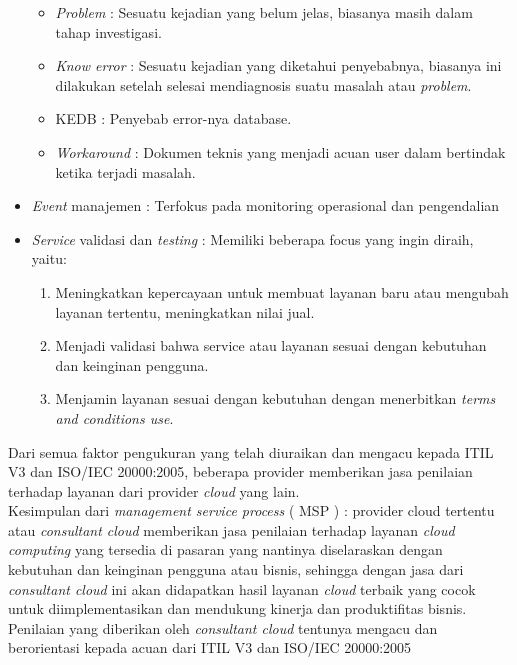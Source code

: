 \begin{itemize}
\begin{itemize}
\item \textit{Problem} : Sesuatu kejadian yang belum jelas, biasanya masih dalam tahap investigasi.
\item \textit{Know error} : Sesuatu kejadian yang diketahui penyebabnya, biasanya ini dilakukan setelah selesai mendiagnosis suatu masalah atau \textit{problem}.
\item KEDB : Penyebab error-nya database.
\item \textit{Workaround} : Dokumen teknis yang menjadi acuan user dalam bertindak ketika terjadi masalah.
\end{itemize}
\item \textit{Event} manajemen : Terfokus pada monitoring operasional dan pengendalian
\item \textit{Service} validasi dan \textit{testing} : Memiliki beberapa focus yang ingin diraih, yaitu:
\begin{enumerate}
\item Meningkatkan kepercayaan untuk membuat layanan baru atau mengubah layanan tertentu, meningkatkan nilai jual.
\item Menjadi validasi bahwa service atau layanan sesuai dengan kebutuhan dan keinginan pengguna.
\item Menjamin layanan sesuai dengan kebutuhan dengan menerbitkan \textit{terms and conditions use}.
\end{enumerate}
\end{itemize}
\tab Dari semua faktor pengukuran yang telah diuraikan dan mengacu kepada ITIL V3 dan ISO/IEC 20000:2005, beberapa provider memberikan jasa penilaian terhadap layanan dari provider \textit{cloud} yang lain.\\
\tab Kesimpulan dari \textit{management service process} ( MSP ) : provider cloud tertentu atau \textit{consultant cloud} memberikan jasa penilaian terhadap layanan \textit{cloud computing} yang tersedia di pasaran yang nantinya diselaraskan dengan kebutuhan dan keinginan pengguna atau bisnis, sehingga dengan jasa dari \textit{consultant cloud} ini akan didapatkan hasil layanan \textit{cloud} terbaik yang cocok untuk diimplementasikan dan mendukung kinerja dan produktifitas bisnis.\\
\tab Penilaian yang diberikan oleh \textit{consultant cloud} tentunya mengacu dan berorientasi kepada acuan dari ITIL V3 dan ISO/IEC 20000:2005\\\\
